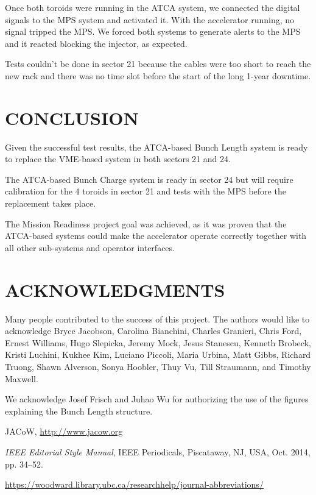 \documentclass[letter,
        biblatex,   %
        keeplastbox,  %
        ]{jacow}
\begin{document}
Once both toroids were running in the ATCA system, we connected the digital signals to the MPS system and activated it. With the accelerator running, no signal tripped the MPS. We forced both systems to generate alerts to the MPS and it reacted blocking the injector, as expected.

Tests couldn't be done in sector 21 because the cables were too short to reach the new rack and there was no time slot before the start of the long 1-year downtime.

\section{CONCLUSION}
Given the successful test results, the ATCA-based Bunch Length system is ready to replace the VME-based system in both sectors 21 and 24.

The ATCA-based Bunch Charge system is ready in sector 24 but will require calibration for the 4 toroids in sector 21 and tests with the MPS before the replacement takes place.

The Mission Readiness project goal was achieved, as it was proven that the ATCA-based systems could make the accelerator operate correctly together with all other sub-systems and operator interfaces.

\section{ACKNOWLEDGMENTS}
Many people contributed to the success of this project. The authors would like to acknowledge Bryce Jacobson, Carolina Bianchini, Charles Granieri, Chris Ford, Ernest Williams, Hugo Slepicka, Jeremy Mock, Jesus Stanescu, Kenneth Brobeck, Kristi Luchini, Kukhee Kim, Luciano Piccoli, Maria Urbina, Matt Gibbs, Richard Truong, Shawn Alverson, Sonya Hoobler, Thuy Vu, Till Straumann, and Timothy Maxwell.

We acknowledge Josef Frisch and Juhao Wu for authorizing the use of the figures explaining the Bunch Length structure.

%
%
%
	{\printbibliography}%
	{%
	
	\begin{thebibliography}{9} %
	
		JACoW,
		\url{http://www.jacow.org}
	
		\textit{IEEE Editorial Style Manual},
		IEEE Periodicals, Piscataway,
		NJ, USA, Oct. 2014, pp. 34--52.

	\url{https://woodward.library.ubc.ca/researchhelp/journal-abbreviations/}

	\end{thebibliography}
} %
\end{document}
